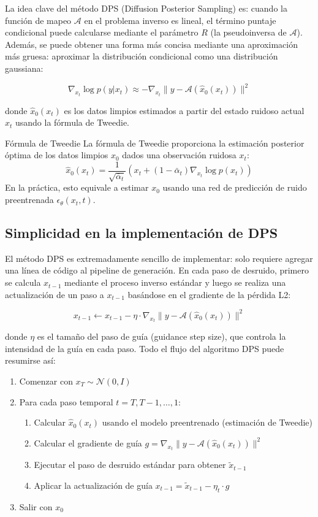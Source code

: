 La idea clave del método DPS (Diffusion Posterior Sampling) es: cuando la función de mapeo $\mathcal{A}$ en el problema inverso es lineal, el término puntaje condicional puede calcularse mediante el parámetro $R$ (la pseudoinversa de $\mathcal{A}$). Además, se puede obtener una forma más concisa mediante una aproximación más gruesa: aproximar la distribución condicional como una distribución gaussiana:

$$\nabla_{x_t} \log p(y | x_t) \approx -\nabla_{x_t} \| y - \mathcal{A}(\hat{x}_0(x_t)) \|^2$$

donde $\hat{x}_0(x_t)$ es los datos limpios estimados a partir del estado ruidoso actual $x_t$ usando la fórmula de Tweedie.

\begin{knowledgebox}{Fórmula de Tweedie}
La fórmula de Tweedie proporciona la estimación posterior óptima de los datos limpios $x_0$ dados una observación ruidosa $x_t$:
$$\hat{x}_0(x_t) = \frac{1}{\sqrt{\bar{\alpha}_t}} \left( x_t + (1 - \bar{\alpha}_t) \nabla_{x_t} \log p(x_t) \right)$$
En la práctica, esto equivale a estimar $x_0$ usando una red de predicción de ruido preentrenada $\epsilon_\theta(x_t, t)$.
\end{knowledgebox}

\subsection{Simplicidad en la implementación de DPS}

El método DPS es extremadamente sencillo de implementar: solo requiere agregar una línea de código al pipeline de generación. En cada paso de desruido, primero se calcula $x_{t-1}$ mediante el proceso inverso estándar y luego se realiza una actualización de un paso a $x_{t-1}$ basándose en el gradiente de la pérdida L2:

$$x_{t-1} \leftarrow x_{t-1} - \eta \cdot \nabla_{x_t} \| y - \mathcal{A}(\hat{x}_0(x_t)) \|^2$$

donde $\eta$ es el tamaño del paso de guía (guidance step size), que controla la intensidad de la guía en cada paso. Todo el flujo del algoritmo DPS puede resumirse así:

\begin{enumerate}
    \item Comenzar con $x_T \sim \mathcal{N}(0, I)$
    \item Para cada paso temporal $t = T, T-1, \ldots, 1$:
    \begin{enumerate}
        \item Calcular $\hat{x}_0(x_t)$ usando el modelo preentrenado (estimación de Tweedie)
        \item Calcular el gradiente de guía $g = \nabla_{x_t} \| y - \mathcal{A}(\hat{x}_0(x_t)) \|^2$
        \item Ejecutar el paso de desruido estándar para obtener $\tilde{x}_{t-1}$
        \item Aplicar la actualización de guía $x_{t-1} = \tilde{x}_{t-1} - \eta_t \cdot g$
    \end{enumerate}
    \item Salir con $x_0$
\end{enumerate}

